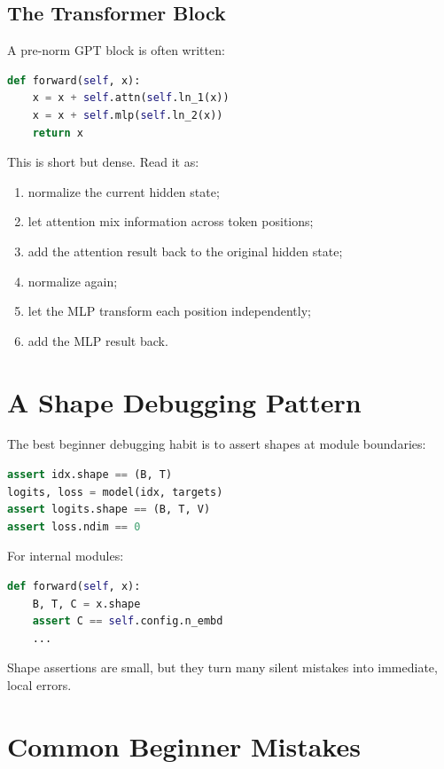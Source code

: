 \subsection{The Transformer Block}

A pre-norm GPT block is often written:

\begin{lstlisting}[language=Python]
def forward(self, x):
    x = x + self.attn(self.ln_1(x))
    x = x + self.mlp(self.ln_2(x))
    return x
\end{lstlisting}

This is short but dense. Read it as:

\begin{enumerate}
  \item normalize the current hidden state;
  \item let attention mix information across token positions;
  \item add the attention result back to the original hidden state;
  \item normalize again;
  \item let the MLP transform each position independently;
  \item add the MLP result back.
\end{enumerate}

\section{A Shape Debugging Pattern}

The best beginner debugging habit is to assert shapes at module boundaries:

\begin{lstlisting}[language=Python]
assert idx.shape == (B, T)
logits, loss = model(idx, targets)
assert logits.shape == (B, T, V)
assert loss.ndim == 0
\end{lstlisting}

For internal modules:

\begin{lstlisting}[language=Python]
def forward(self, x):
    B, T, C = x.shape
    assert C == self.config.n_embd
    ...
\end{lstlisting}

Shape assertions are small, but they turn many silent mistakes into immediate, local errors.

\section{Common Beginner Mistakes}

